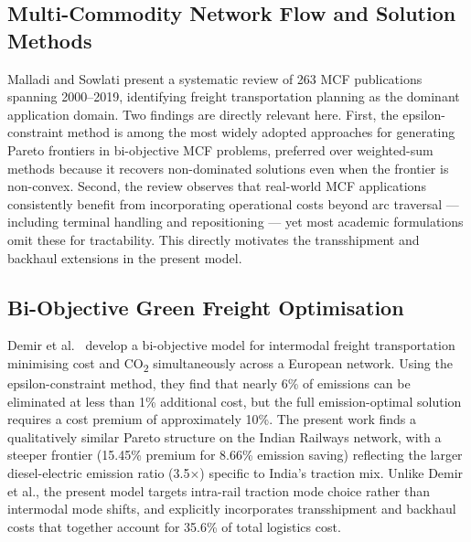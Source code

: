 \documentclass[11pt, a4paper]{article}
\numberwithin{equation}{section}
\numberwithin{figure}{section}
\numberwithin{table}{section}
\begin{document}
\subsection{Multi-Commodity Network Flow and Solution Methods}

Malladi and Sowlati \cite{malladi2020} present a systematic review of 263 MCF
publications spanning 2000--2019, identifying freight transportation planning as the
dominant application domain. Two findings are directly relevant here. First, the
epsilon-constraint method is among the most widely adopted approaches for generating
Pareto frontiers in bi-objective MCF problems, preferred over weighted-sum methods
because it recovers non-dominated solutions even when the frontier is non-convex.
Second, the review observes that real-world MCF applications consistently benefit from
incorporating operational costs beyond arc traversal — including terminal handling and
repositioning — yet most academic formulations omit these for tractability. This
directly motivates the transshipment and backhaul extensions in the present model.

\subsection{Bi-Objective Green Freight Optimisation}

Demir et al.\ \cite{demir2019} develop a bi-objective model for intermodal freight
transportation minimising cost and CO\textsubscript{2} simultaneously across a European
network. Using the epsilon-constraint method, they find that nearly 6\% of emissions can
be eliminated at less than 1\% additional cost, but the full emission-optimal solution
requires a cost premium of approximately 10\%. The present work finds a qualitatively
similar Pareto structure on the Indian Railways network, with a steeper frontier
(15.45\% premium for 8.66\% emission saving) reflecting the larger diesel-electric
emission ratio (3.5$\times$) specific to India's traction mix. Unlike Demir et al.,
the present model targets intra-rail traction mode choice rather than intermodal mode
shifts, and explicitly incorporates transshipment and backhaul costs that together
account for 35.6\% of total logistics cost.
\end{document}
